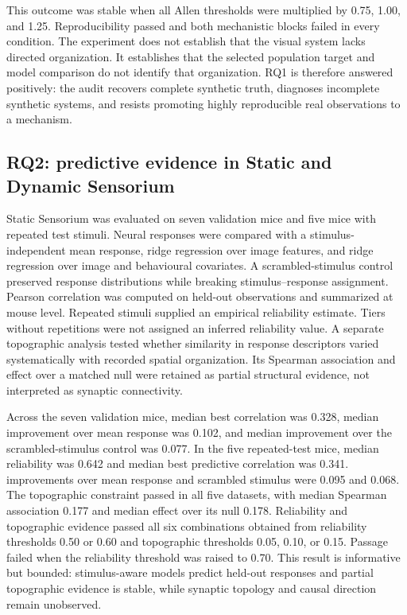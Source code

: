 This outcome was stable when all Allen thresholds were multiplied by 0.75,
1.00, and 1.25. Reproducibility passed and both mechanistic blocks failed in
every condition. The experiment does not establish that the visual system lacks
directed organization. It establishes that the selected population target and
model comparison do not identify that organization. RQ1 is therefore answered
positively: the audit recovers complete synthetic truth, diagnoses incomplete
synthetic systems, and resists promoting highly reproducible real observations
to a mechanism.

\subsection{RQ2: predictive evidence in Static and Dynamic Sensorium}
\label{subsec:rq2-sensorium}

Static Sensorium was evaluated on seven validation mice and five mice with
repeated test stimuli. Neural responses were compared with a
stimulus-independent mean response, ridge regression over image features, and
ridge regression over image and behavioural covariates. A scrambled-stimulus
control preserved response distributions while breaking stimulus--response
assignment. Pearson correlation was computed on held-out observations and
summarized at mouse level. Repeated stimuli supplied an empirical reliability
estimate. Tiers without repetitions were not assigned an inferred reliability
value. A separate topographic analysis tested whether similarity in response
descriptors varied systematically with recorded spatial organization. Its
Spearman association and effect over a matched null were retained as partial
structural evidence, not interpreted as synaptic connectivity.

Across the seven validation mice, median best correlation was 0.328, median
improvement over mean response was 0.102, and median improvement over the
scrambled-stimulus control was 0.077. In the five repeated-test mice, median
reliability was 0.642 and median best predictive correlation was 0.341.
improvements over mean response and scrambled stimulus were 0.095 and 0.068.
The topographic constraint passed in all five datasets, with median Spearman
association 0.177 and median effect over its null 0.178. Reliability and
topographic evidence passed all six combinations obtained from reliability
thresholds 0.50 or 0.60 and topographic thresholds 0.05, 0.10, or 0.15. Passage
failed when the reliability threshold was raised to 0.70. This result is
informative but bounded: stimulus-aware models predict held-out responses and
partial topographic evidence is stable, while synaptic topology and causal
direction remain unobserved.

